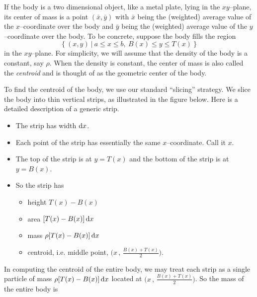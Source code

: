 If the body is a two dimensional object, like a metal plate, lying in
the $xy$--plane, its center of mass is a point $(\bar x,\bar y)$
with $\bar x$ being the (weighted) average value of the $x$--coordinate
over the body and $\bar y$ being the (weighted) average value of the
$y$--coordinate over the body. To be concrete, suppose the body fills the
region
\begin{equation*}
\big\{\ (x,y)\ \big|\ a\le x\le b,\ B(x)\le y\le T(x)\ \big\}
\end{equation*}
in the $xy$--plane. For simplicity, we will assume that the density
of the body is a constant, say $\rho$. When the density is constant,
the center of mass is also called the \emph{centroid} and is thought of
as the geometric center of the body.

To find the centroid of the body, we use our standard ``slicing''
strategy. We slice the body into thin vertical strips, as illustrated in
the figure below.%
Here is a detailed description of a generic strip.
\begin{itemize}\itemsep1pt \parskip0pt  %
\item The strip has width $\mathrm{d}x$.
\item Each point of the strip has essentially the same $x$--coordinate.
Call it $x$.
\item The top of the strip is at $y=T(x)$ and the bottom of the strip is
at $y=B(x)$.
\item So the strip has
\begin{itemize}\itemsep1pt \parskip0pt  %
\item height $T(x)-B(x)$
\item area $[T(x)-B(x)]\,\mathrm{d}x$
\item mass $\rho[T(x)-B(x)]\,\mathrm{d}x$
\item centroid, i.e. middle point, $\big(x\,,\,\frac{B(x)+T(x)}{2}\big)$.
\end{itemize}
\end{itemize}
In computing the centroid of the entire body, we may treat each strip as
a single particle of mass $\rho[T(x)-B(x)]\,\mathrm{d}x$ located at
$\big(x\,,\,\frac{B(x)+T(x)}{2}\big)$. So the mass of the entire body is
